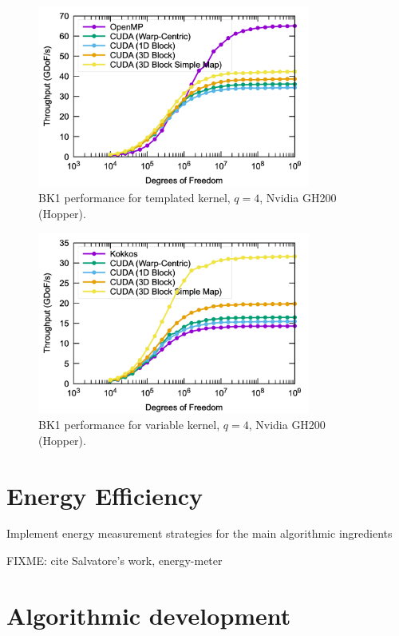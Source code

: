 \documentclass[a4paper,12pt]{article}
\begin{document}
\begin{figure}[htbp]
  \centering
  \includegraphics[width=0.8\textwidth]{gh200_templated} %
  \caption{BK1 performance for templated kernel, $q = 4$, Nvidia GH200 (Hopper).}
  \label{fig:gh200_templated}
\end{figure}

\begin{figure}[htbp]
  \centering
  \includegraphics[width=0.8\textwidth]{gh200_variable} %
  \caption{BK1 performance for variable kernel, $q = 4$, Nvidia GH200 (Hopper).}
  \label{fig:gh200_variable}
\end{figure}



\section{Energy Efficiency}

Implement energy measurement strategies for the main algorithmic ingredients

FIXME: cite Salvatore's work, energy-meter 

\section{Algorithmic development}
\end{document}
